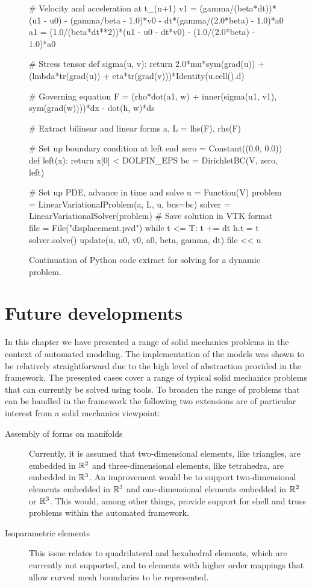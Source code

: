 \begin{figure}
\bwfig
\begin{python}
# Velocity and acceleration at t_(n+1)
v1 = (gamma/(beta*dt))*(u1 - u0) - (gamma/beta - 1.0)*v0 - dt*(gamma/(2.0*beta) - 1.0)*a0
a1 = (1.0/(beta*dt**2))*(u1 - u0 - dt*v0) - (1.0/(2.0*beta) - 1.0)*a0

# Stress tensor
def sigma(u, v):
    return 2.0*mu*sym(grad(u)) + (lmbda*tr(grad(u)) + eta*tr(grad(v)))*Identity(u.cell().d)

# Governing equation
F = (rho*dot(a1, w) + inner(sigma(u1, v1), sym(grad(w))))*dx - dot(h, w)*ds

# Extract bilinear and linear forms
a, L = lhs(F), rhs(F)

# Set up boundary condition at left end
zero = Constant((0.0, 0.0))
def left(x):
    return x[0] < DOLFIN_EPS
bc = DirichletBC(V, zero, left)

# Set up PDE, advance in time and solve
u = Function(V)
problem = LinearVariationalProblem(a, L, u, bcs=bc)
solver = LinearVariationalSolver(problem)
# Save solution in VTK format
file = File("displacement.pvd")
while t <= T:
    t += dt
    h.t = t
    solver.solve()
    update(u, u0, v0, a0, beta, gamma, dt)
    file << u
\end{python}
\caption{Continuation of Python code extract for solving for a dynamic
problem.}
\label{fig:oelgaard-1:time_ufl_code2}
\end{figure}

\section{Future developments}

In this chapter we have presented a range of solid mechanics problems in
the context of automated modeling.  The implementation of the models
was shown to be relatively straightforward due to the high level of
abstraction provided in the \fenics framework.  The presented cases
cover a range of typical solid mechanics problems that can currently be
solved using \fenics tools.  To broaden the range of problems that can
be handled in the \fenics framework the following two extensions are of
particular interest from a solid mechanics viewpoint:
\begin{description}
\item [Assembly of forms on manifolds] Currently, it is assumed that
two-dimensional elements, like triangles, are embedded in $\mathbb{R}^2$ and
three-dimensional elements, like tetrahedra, are embedded in $\mathbb{R}^3$.
An improvement would be to support two-dimensional elements embedded
in $\mathbb{R}^3$ and one-dimensional elements embedded in $\mathbb{R}^2$ or $\mathbb{R}^3$.
This would, among other things, provide support for shell and truss
problems within the automated framework.

\item [Isoparametric elements] This issue relates to quadrilateral
and hexahedral elements, which are currently not supported, and to
elements with higher order mappings that allow curved mesh boundaries
to be represented.
\end{description}
